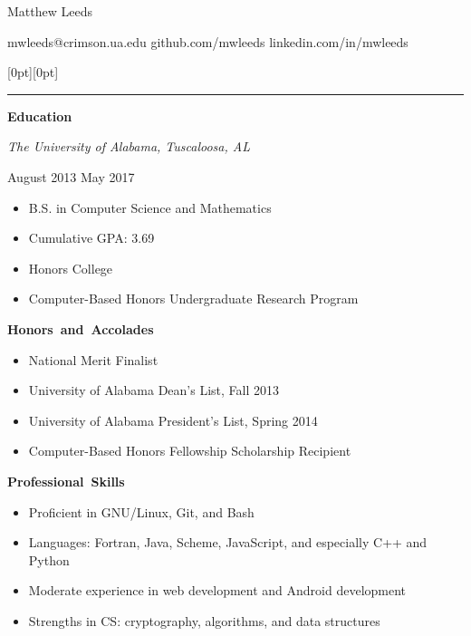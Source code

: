 \documentclass[11pt]{article}
\begin{document}
\centerline{\huge Matthew Leeds}
\vspace{0.4em}
\centerline{\normalsize mwleeds@crimson.ua.edu \space \textbar \space github.com/mwleeds \space \textbar \space linkedin.com/in/mwleeds}

\noindent \begin{minipage}[t]{1.04\textwidth}
\raisebox{9pt}[0pt][0pt]{\rule{\textwidth}{0.2mm}\hspace{-\textwidth}}
\end{minipage}

\vspace{0.8em}
\hbox{\large \textbf{Education}}

\begin{minipage}[t]{0.7\textwidth}
\flushleft
\textit{The University of Alabama, Tuscaloosa, AL}\\
\end{minipage}
\begin{minipage}[t]{0.3\textwidth}
\flushright
August 2013 \space \textemdash \space May 2017\\
\end{minipage}

\begin{itemize}
  \item B.S. in Computer Science and Mathematics
  \item Cumulative GPA: 3.69
  \item Honors College
  \item Computer-Based Honors Undergraduate Research Program
\end{itemize}

\vspace{0.8em}
\hbox{\large \textbf{Honors and Accolades}}

\begin{itemize}
  \item National Merit Finalist
  \item University of Alabama Dean's List, Fall 2013
  \item University of Alabama President's List, Spring 2014
  \item Computer-Based Honors Fellowship Scholarship Recipient
\end{itemize}

\vspace{0.8em}
\hbox{\large \textbf{Professional Skills}}

\begin{itemize}
  \item Proficient in GNU/Linux, Git, and Bash
  \item Languages: Fortran, Java, Scheme, JavaScript, and especially C++ and Python
  \item Moderate experience in web development and Android development
  \item Strengths in CS: cryptography, algorithms, and data structures
\end{itemize}
\end{document}
